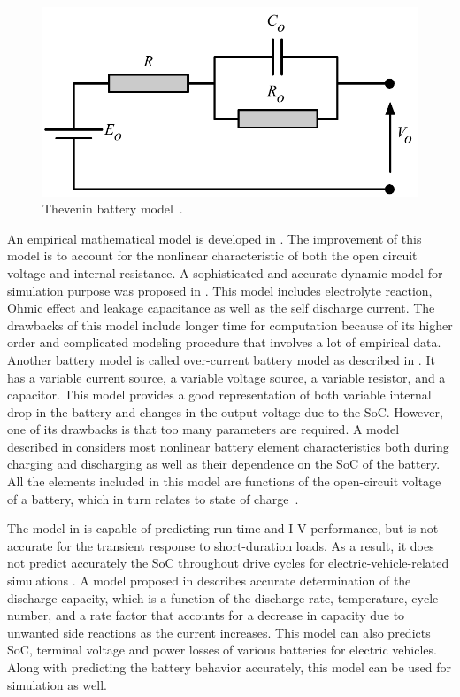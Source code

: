 \begin{figure}[b]
\centering
\includegraphics[scale=0.5]{Figures/Zili_Shao/ZS_figure1.pdf}
\caption{Thevenin battery model~\cite{ZS_salameh}.}
\label{fig:ZS_battery_model}
\end{figure}

An empirical mathematical model is developed in \cite{ZS_jayne,ZS_sims}. The improvement of this model is to account for the nonlinear
characteristic of both the open circuit voltage and
internal resistance. A sophisticated and accurate dynamic model for simulation purpose was proposed in \cite{ZS_gig}. This model includes electrolyte reaction, Ohmic effect and leakage capacitance as well as the self discharge current. The drawbacks of this model include longer time for computation because of its higher order and complicated modeling procedure that involves a lot of empirical data. Another battery model is called over-current battery model as described in \cite{ZS_rob}. It has a variable
current source, a variable voltage source, a variable resistor, and a capacitor. 
This model provides a good representation of both variable
internal drop in the battery and changes in the output voltage
due to the SoC. However, one of its drawbacks is
that too many parameters are required. A model described in \cite{ZS_zi,ZS_mar}
considers most nonlinear battery element characteristics both during charging and 
discharging as well as their dependence on the SoC of the battery. All the elements included in this model are functions of the
open-circuit voltage of a battery, which in turn relates to state of
charge~\cite{ZS_chan}.


The model in \cite{ZS_chen} is capable of predicting run time and I-V performance, but is not
accurate for the transient response to short-duration loads. As a result, it does not predict accurately
the SoC throughout drive cycles for electric-vehicle-related simulations \cite{ZS_kro}. A model proposed in \cite{ZS_kro} describes accurate determination of the discharge capacity, which is a function of the discharge rate, temperature, cycle number, and a rate factor that accounts
for a decrease in capacity due to unwanted side reactions
 as the current increases. This model can also predicts SoC, terminal voltage and power losses of various batteries for electric vehicles. Along with predicting the battery behavior accurately, this model can be used for simulation as well. 
 
